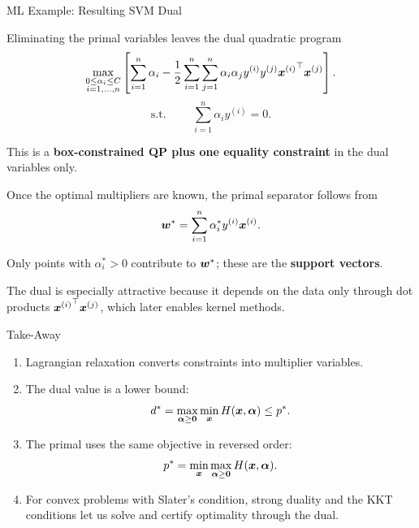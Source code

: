 \documentclass[11pt,compress,t,notes=noshow, xcolor=table]{beamer}
\newcommand{\alphav}{\bm{\alpha}}
\begin{document}
\begin{framei}[fs=small]{ML Example: Resulting SVM Dual}
\item Eliminating the primal variables leaves the dual quadratic program
$$
\max_{\substack{0 \le \alpha_i \le C \\ i=1,\dots,n}}
\left[
\sum_{i=1}^n \alpha_i
-
\frac{1}{2}
\sum_{i=1}^n \sum_{j=1}^n
\alpha_i \alpha_j y^{(i)} y^{(j)} {\bm{x}^{(i)}}^\top \bm{x}^{(j)}
\right].
$$
\vspace*{-0.3cm}
$$
\text{s.t. } \qquad \sum_{i=1}^n \alpha_i y^{(i)} = 0.
$$
\item This is a \textbf{box-constrained QP plus one equality constraint} in the dual variables only.
\item Once the optimal multipliers are known, the primal separator follows from
$$
\bm{w}^\ast = \sum_{i=1}^n \alpha_i^\ast y^{(i)} \bm{x}^{(i)}.
$$
\item Only points with $\alpha_i^\ast > 0$ contribute to $\bm{w}^\ast$; these are the \textbf{support vectors}.
\item The dual is especially attractive because it depends on the data only through dot products ${\bm{x}^{(i)}}^\top \bm{x}^{(j)}$, which later enables kernel methods.
\end{framei}


\begin{framev}{Take-Away}
\begin{enumerate}
\item Lagrangian relaxation converts constraints into multiplier variables.
\item The dual value is a lower bound:
$$
d^\ast = \max_{\alphav \ge \zero} \min_{\xv} H(\xv,\alphav) \le p^\ast.
$$
\item The primal uses the same objective in reversed order:
$$
p^\ast = \min_{\xv} \max_{\alphav \ge \zero} H(\xv,\alphav).
$$
\item For convex problems with Slater's condition, strong duality and the KKT conditions let us solve and certify optimality through the dual.
\end{enumerate}
\vfill
{}
\end{framev}

\endlecture
\end{document}
